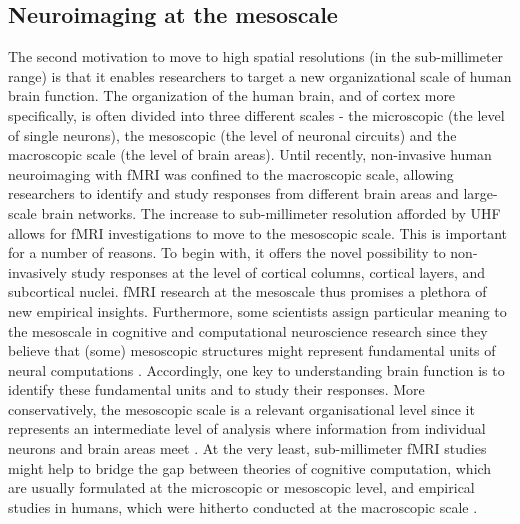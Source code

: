 \subsection{Neuroimaging at the mesoscale}
The second motivation to move to high spatial resolutions (in the sub-millimeter range) is that it enables researchers to target a new organizational scale of human brain function. The organization of the human brain, and of cortex more specifically, is often divided into three different scales - the microscopic (the level of single neurons), the mesoscopic (the level of neuronal circuits) and the macroscopic scale (the level of brain areas). Until recently, non-invasive human neuroimaging with fMRI was confined to the macroscopic scale, allowing researchers to identify and study responses from different brain areas and large-scale brain networks. The increase to sub-millimeter resolution afforded by UHF allows for fMRI investigations to move to the mesoscopic scale. This is important for a number of reasons. To begin with, it offers the novel possibility to non-invasively study responses at the level of cortical columns, cortical layers, and subcortical nuclei. fMRI research at the mesoscale thus promises a plethora of new empirical insights. Furthermore, some scientists assign particular meaning to the mesoscale in cognitive and computational neuroscience research since they believe that (some) mesoscopic structures might represent fundamental units of neural computations \parencite{Hubel1974, Dumoulin2017}. Accordingly, one key to understanding brain function is to identify these fundamental units and to study their responses. More conservatively, the mesoscopic scale is a relevant organisational level since it represents an intermediate level of analysis where information from individual neurons and brain areas meet \parencite{Mitra2014, DeMartino2016}. At the very least, sub-millimeter fMRI studies might help to bridge the gap between theories of cognitive computation, which are usually formulated at the microscopic or mesoscopic level, and empirical studies in humans, which were hitherto conducted at the macroscopic scale \parencite{MarquardtPhDThesis}.

